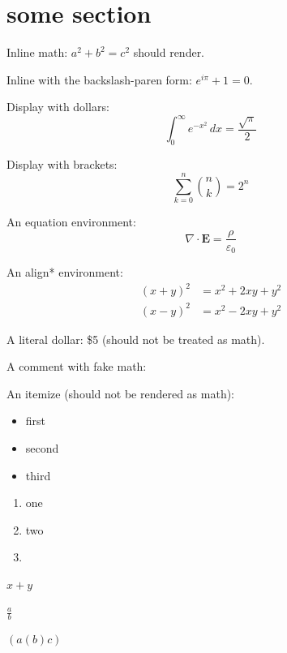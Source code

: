 \documentclass{article}
\begin{document}
\section{some section}


Inline math: $a^2 + b^2 = c^2$ should render.

Inline with the backslash-paren form: \(e^{i\pi} + 1 = 0\).

Display with dollars:
$$
    \int_0^\infty e^{-x^2}\,dx = \frac{\sqrt{\pi}}{2}
$$

Display with brackets:
\[
    \sum_{k=0}^{n} \binom{n}{k} = 2^n
\]

An equation environment:
\begin{equation}
    \nabla \cdot \mathbf{E} = \frac{\rho}{\varepsilon_0}
\end{equation}

An align* environment:
\begin{align*}
    (x+y)^2 & = x^2 + 2xy + y^2 \\
    (x-y)^2 & = x^2 - 2xy + y^2
\end{align*}

A literal dollar: \$5 (should not be treated as math).

A comment with fake math: %

An itemize (should not be rendered as math):
\begin{itemize}
    \item first
    \item second
    \item third
\end{itemize}

\begin{enumerate}
    \item one
    \item two
    \item
\end{enumerate}

$x + y$

$\frac{a}{b}$

$\left( a \left( b \right) c \right)$
\end{document}
